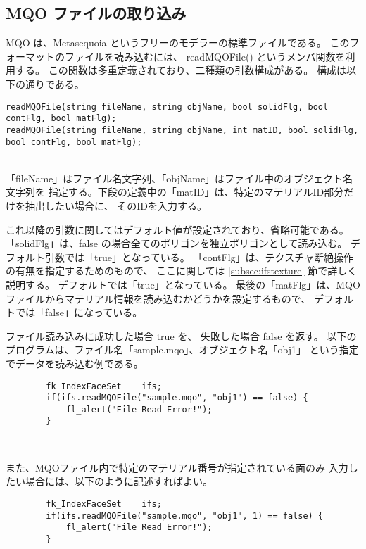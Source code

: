 \subsection{MQO ファイルの取り込み} \label{subsec:mqoread}
MQO は、Metasequoia というフリーのモデラーの標準ファイルである。
このフォーマットのファイルを読み込むには、
readMQOFile() というメンバ関数を利用する。
この関数は多重定義されており、二種類の引数構成がある。
構成は以下の通りである。
\\
\begin{screen}
\begin{small}
\begin{verbatim}
readMQOFile(string fileName, string objName, bool solidFlg, bool contFlg, bool matFlg);
readMQOFile(string fileName, string objName, int matID, bool solidFlg, bool contFlg, bool matFlg);
\end{verbatim}
\end{small}
\end{screen}
~ \\
「fileName」はファイル名文字列、「objName」はファイル中のオブジェクト名文字列を
指定する。下段の定義中の「matID」は、特定のマテリアルID部分だけを抽出したい場合に、
そのIDを入力する。

これ以降の引数に関してはデフォルト値が設定されており、省略可能である。
「solidFlg」は、false の場合全てのポリゴンを独立ポリゴンとして読み込む。
デフォルト引数では「true」となっている。
「contFlg」は、テクスチャ断絶操作の有無を指定するためのもので、
ここに関しては \ref{subsec:ifstexture} 節で詳しく説明する。
デフォルトでは「true」となっている。
最後の「matFlg」は、MQOファイルからマテリアル情報を読み込むかどうかを設定するもので、
デフォルトでは「false」になっている。

ファイル読み込みに成功した場合 true を、
失敗した場合 false を返す。
以下のプログラムは、ファイル名「sample.mqo」、オブジェクト名「obj1」
という指定でデータを読み込む例である。
\\
\begin{screen}
\begin{verbatim}
        fk_IndexFaceSet    ifs;
        if(ifs.readMQOFile("sample.mqo", "obj1") == false) {
            fl_alert("File Read Error!");
        }
\end{verbatim}
\end{screen} ~

また、MQOファイル内で特定のマテリアル番号が指定されている面のみ
入力したい場合には、以下のように記述すればよい。
\begin{screen}
\begin{verbatim}
        fk_IndexFaceSet    ifs;
        if(ifs.readMQOFile("sample.mqo", "obj1", 1) == false) {
            fl_alert("File Read Error!");
        }
\end{verbatim}
\end{screen} ~

